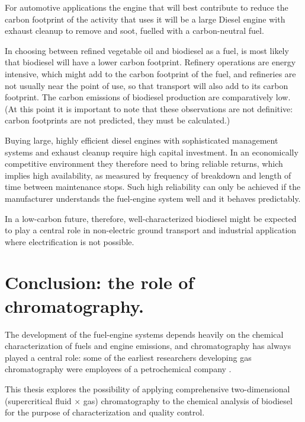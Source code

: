 For automotive applications the engine that will best contribute to reduce the
carbon footprint of the activity that uses it will be a large Diesel engine with
exhaust cleanup to remove \nox and soot, fuelled with a carbon-neutral fuel.

In choosing between refined vegetable oil and biodiesel as a fuel, is most
likely that biodiesel will have a lower carbon footprint. Refinery operations
are energy intensive, which might add to the carbon footprint of the fuel, and
refineries are not usually near the point of use, so that transport will also
add to its carbon footprint. The carbon emissions of biodiesel production are
comparatively low. (At this point it is important to note that these
observations are not definitive: carbon footprints are not predicted, they must
be calculated.)

Buying large, highly efficient diesel engines with sophisticated management
systems and exhaust cleanup require high capital investment. In an economically
competitive environment they therefore need to bring reliable returns, which
implies high availability, as measured by frequency of breakdown and length of
time between maintenance stops. Such high reliability can only be achieved if
the manufacturer understands the fuel-engine system well and it behaves
predictably.

In a low-carbon future, therefore, well-characterized biodiesel might be
expected to play a central role in non-electric ground transport and industrial
application where electrification is not possible.

\section{Conclusion: the role of chromatography.}

The development of the fuel-engine systems depends heavily on the chemical
characterization of fuels and engine emissions, and chromatography has always
played a central role: some of the earliest researchers developing gas
chromatography were employees of a petrochemical company
\autocite{Keulemans1955}.

This thesis explores the possibility of applying comprehensive two-dimensional
(supercritical fluid $\times$ gas) chromatography to the chemical
analysis of biodiesel for the purpose of characterization and quality control. 


